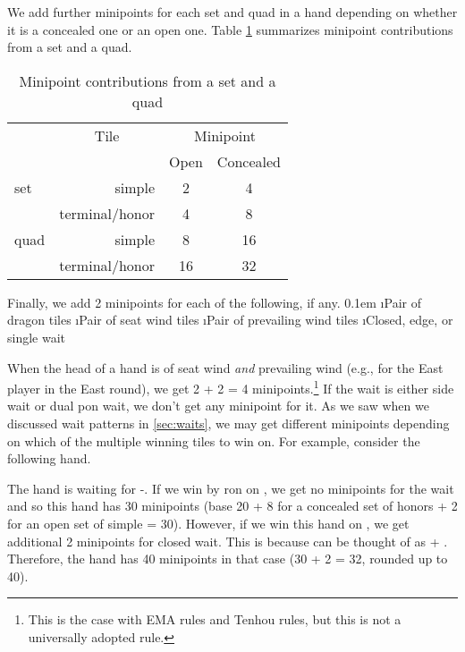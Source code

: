 We add further minipoints for each set and quad in a hand depending on whether it is a concealed one or an open one. Table \ref{tbl:minip_set} summarizes minipoint contributions from a set and a quad. 
{\begin{table}[h!]\centering\small\captionsetup{font=small}
\caption{Minipoint contributions from a set and a quad} \label{tbl:minip_set}
\begin{tabular}{l r c c}
\toprule
& \multicolumn{1}{c}{Tile} & \multicolumn{2}{c}{Minipoint}\\
&  & {\footnotesize Open} & {\footnotesize Concealed}\\
\midrule
set	& simple & 2 & 4\\
	& terminal/honor & 4 & 8\\
\midrule
quad	 & simple & 8 & 16\\
	& terminal/honor & 16 & 32\\
\bottomrule
\end{tabular}
\end{table}}

Finally, we add 2 minipoints for each of the following, if any. 
\bi \itemsep0.1em
\i Pair of dragon tiles
\i Pair of seat wind tiles
\i Pair of prevailing wind tiles
\i Closed, edge, or single wait
\ei

When the head of a hand is of seat wind \emph{and} prevailing wind (e.g., {\LARGE\dong} for the East player in the East round), we get 2 + 2 = 4 minipoints.\footnote{This is the case with EMA rules and {\jap Tenhou} rules, but this is not a universally adopted rule.} 
If the wait is either side wait or dual {\jap pon} wait, we don't get any minipoint for it.
As we saw when we discussed wait patterns in \ref{sec:waits}, we may get different minipoints depending on which of the multiple winning tiles to win on. 
For example, consider the following hand.
\bp
{}\zhong\zhong\zhong~
\ep

\bigskip
The hand is waiting for {\LARGE{}-}. If we win by {\jap ron} on {\LARGE{}}, we get no minipoints for the wait and so this hand has 30 minipoints (base 20 + 8 for a concealed set of honors + 2 for an open set of simple = 30). However, if we win this hand on {\LARGE{}}, we get additional 2 minipoints for closed wait. This is because {\LARGE{}} can be thought of as {\LARGE{} + }. Therefore, the hand has 40 minipoints in that case (30 + 2 = 32, rounded up to 40). 

